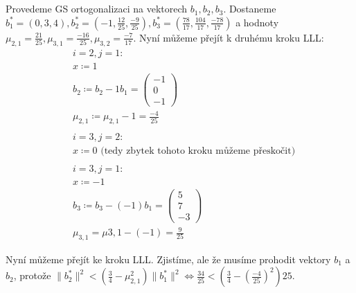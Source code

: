 \documentclass[12pt, a4paper]{article}
\begin{document}
\section{}
Provedeme GS ortogonalizaci na vektorech $b_1, b_2, b_3$. Dostaneme $b_1^* = (0, 3, 4), b_2^* = (-1, \frac{12}{25}, \frac{-9}{25}), b_3^* = (\frac{78}{17}, \frac{104}{17}, \frac{-78}{17})$ a hodnoty $\mu_{2,1} = \frac{21}{25}, \mu_{3,1} = \frac{-16}{25}, \mu_{3,2} = \frac{-7}{17}$. Nyní můžeme přejít k druhému kroku LLL:
\begin{align*}
&i=2, j=1:\\
&x \coloneqq 1\\
&b_2 \coloneqq b_2-1b_1=\begin{pmatrix}
-1\\
0\\
-1
\end{pmatrix}\\
&\mu_{2,1} \coloneqq \mu_{2,1}-1 = \frac{-4}{25}\\\\
&i=3, j=2:\\
&x \coloneqq 0 \text{ (tedy zbytek tohoto kroku můžeme přeskočit)}\\\\
&i=3, j=1:\\
&x \coloneqq -1\\
&b_3 \coloneqq b_3 - (-1)b_1 = \begin{pmatrix}
5\\
7\\
-3
\end{pmatrix}\\
&\mu_{3,1} = \mu{3,1} - (-1) = \frac{9}{25}
\end{align*}

Nyní můžeme přejít ke  kroku LLL. Zjistíme, ale že musíme prohodit vektory $b_1$ a $b_2$, protože $\| b_2^* \|^2 < (\frac{3}{4} - \mu_{2,1}^2)\| b_1^* \|^2 \iff \frac{34}{25} < (\frac{3}{4}-(\frac{-4}{25})^2)25$. 
\end{document}
